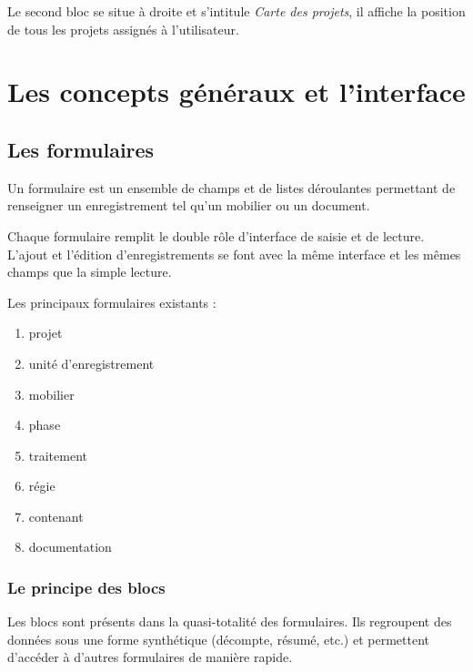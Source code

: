 \documentclass[letterpaper,10pt,french]{sphinxmanual}
\begin{document}
Le second bloc se situe à droite et s'intitule \emph{Carte des projets}, il affiche la position de tous les projets assignés à l'utilisateur.


\chapter{Les concepts généraux et l'interface}
\label{manuel/interface::doc}\label{manuel/interface:les-concepts-generaux-et-l-interface}

\section{Les formulaires}
\label{manuel/interface:les-formulaires}
Un formulaire est un ensemble de champs et de listes déroulantes permettant de renseigner un enregistrement tel qu'un mobilier ou un document.

Chaque formulaire remplit le double rôle d'interface de saisie et de lecture. L'ajout et l'édition d'enregistrements se font avec la même interface et les mêmes champs que la simple lecture.

Les principaux formulaires existants  :
\begin{enumerate}
\item {} 
projet

\item {} 
unité d'enregistrement

\item {} 
mobilier

\item {} 
phase

\item {} 
traitement

\item {} 
régie

\item {} 
contenant

\item {} 
documentation

\end{enumerate}


\subsection{Le principe des blocs}
\label{manuel/interface:le-principe-des-blocs}
Les blocs sont présents dans la quasi-totalité des formulaires. Ils regroupent des données sous une forme synthétique (décompte, résumé, etc.) et permettent d'accéder à d'autres formulaires de manière rapide.
\end{document}
